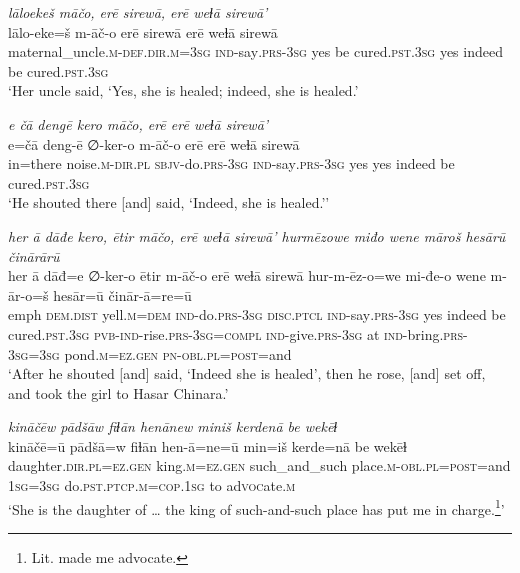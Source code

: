 \ea \label{ZP.58}
\textit{lāloekeš māčo, erē sirewā, erē weɫā sirewā’} \\ 
\gll lālo-eke=š m-āč-o erē sirewā erē weɫā sirewā \\ 
 maternal\_uncle\textsc{.m}\textsc{-def}\textsc{.dir}\textsc{.m}\textsc{=3sg} \textsc{ind-}say\textsc{.prs}\textsc{-3sg} yes be cured\textsc{.pst}\textsc{.3sg} yes indeed be cured\textsc{.pst}\textsc{.3sg} \\ 
\glt `Her uncle said, ‘Yes, she is healed; indeed, she is healed.'
\z 
 
\ea \label{ZP.60}
\textit{e čā dengē kero māčo, erē erē weɫā sirewā’} \\ 
\gll e=čā deng-ē ∅-ker-o m-āč-o erē erē weɫā sirewā \\ 
 in=there noise\textsc{.m}\textsc{-dir}\textsc{.pl} \textsc{sbjv-}do\textsc{.prs}\textsc{-3sg} \textsc{ind-}say\textsc{.prs}\textsc{-3sg} yes yes indeed be cured\textsc{.pst}\textsc{.3sg} \\ 
\glt `He shouted there [and] said, ‘Indeed, she is healed.’'
\z 
 
\ea \label{ZP.61}
\textit{her ā dāđe kero, ētir māčo, erē weɫā sirewā’ hurmēzowe miđo wene māroš hesārū činārārū} \\ 
\gll her ā dāđ=e ∅-ker-o ētir m-āč-o erē weɫā sirewā hur-m-ēz-o=we mi-đe-o wene m-ār-o=š hesār=ū činār-ā=re=ū \\ 
 emph \textsc{dem.dist} yell\textsc{.m}\textsc{=dem} \textsc{ind-}do\textsc{.prs}\textsc{-3sg} \textsc{disc.ptcl} \textsc{ind-}say\textsc{.prs}\textsc{-3sg} yes indeed be cured\textsc{.pst}\textsc{.3sg} \textsc{pvb-}\textsc{ind-}rise\textsc{.prs}\textsc{-3sg}\textsc{=compl} \textsc{ind-}give\textsc{.prs}\textsc{-3sg} at \textsc{ind-}bring\textsc{.prs}\textsc{-3sg}\textsc{=3sg} pond\textsc{.m}\textsc{\textsc{=ez.gen}} \textsc{pn}\textsc{-obl}\textsc{.pl}\textsc{=\textsc{post}}=and \\ 
\glt `After he shouted [and] said, ‘Indeed she is healed’, then he rose, [and] set off, and took the girl to Hasar Chinara.'
\z 
 
\ea \label{ZP.89}
\textit{kināčēw pādšāw fiɫān henānew miniš kerdenā be wekēɫ} \\ 
\gll kināčē=ū pādšā=w fiɫān hen-ā=ne=ū min=iš kerde=nā be wekēɫ \\ 
 daughter\textsc{.dir}\textsc{.pl}\textsc{\textsc{=ez.gen}} king\textsc{.m}\textsc{\textsc{=ez.gen}} such\_and\_such place\textsc{.m}\textsc{-obl}\textsc{.pl}\textsc{=\textsc{post}}=and \textsc{1sg}\textsc{=3sg} do\textsc{.pst}\textsc{.ptcp}\textsc{.m}\textsc{=cop}\textsc{.\textsc{1sg}} to ad\textsc{voc}ate\textsc{.m} \\ 
\glt `She is the daughter of … the king of such-and-such place has put me in charge.\footnote{Lit. made me advocate.}'
\z 
 
